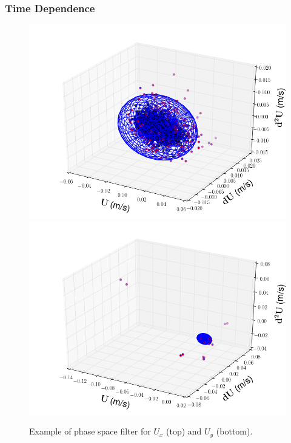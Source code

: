 \documentclass[12pt,oneside,a4paper]{article}
\begin{document}
\subsubsection{Time Dependence}
\begin{figure}
\centering
\includegraphics[width=12cm]{images/LDA_timeDependenceImages/4hz_x_400_z_1_Ux_phaseSpacePlot.png}\\
\includegraphics[width=12cm]{images/LDA_timeDependenceImages/4hz_x_400_z_1_Uy_phaseSpacePlot.png}\\
\caption{Example of phase space filter for $U_x$ (top) and $U_y$ (bottom).}
\label{figure:experiments:filteringExample}
\end{figure}
\end{document}
